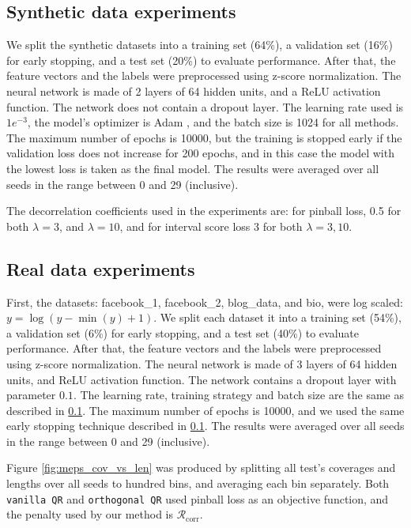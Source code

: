 \documentclass{article}
\begin{document}
\begin{appendices}
\subsection{Synthetic data experiments}\label{syn_exp_description}
We split the synthetic datasets into a training set (64\%), a validation set (16\%) for early stopping, and a test set (20\%) to evaluate performance.
After that, the feature vectors and the labels were preprocessed using z-score normalization.
The neural network is made of 2 layers of 64 hidden units, and a ReLU activation function. The network does not contain a dropout layer. The learning rate used is $1e^{-3}$, the model's optimizer is Adam \cite{adam}, and the batch size is 1024 for all methods.
The maximum number of epochs is 10000, but the training is stopped early if the validation loss does not increase for 200 epochs, and in this case the model with the lowest loss is taken as the final model. 
The results were averaged over all seeds in the range between 0 and 29 (inclusive).

The decorrelation coefficients used in the experiments are: for pinball loss, 0.5 for both $\lambda=3$, and $\lambda=10$, and for interval score loss 3 for both $\lambda=3, 10$.

\subsection{Real data experiments}\label{real_exp_description}
First, the datasets: facebook\_1, facebook\_2, blog\_data, and bio, were log scaled: $y = \log(y-\min(y)+1)$.
We split each dataset it into a training set (54\%), a validation set (6\%) for early stopping, and a test set (40\%) to evaluate performance.
After that, the feature vectors and the labels were preprocessed using z-score normalization.
The neural network is made of 3 layers of 64 hidden units, and ReLU activation function. The network contains a dropout layer with parameter $0.1$. The learning rate, training strategy and batch size are the same as described in \ref{syn_exp_description}.
The maximum number of epochs is 10000, and we used the same early stopping technique described in \ref{syn_exp_description}.
The results were averaged over all seeds in the range between 0 and 29 (inclusive).

Figure \ref{fig:meps_cov_vs_len} was produced by splitting all test's coverages and lengths over all seeds to hundred bins, and averaging each bin separately. Both \texttt{vanilla QR} and \texttt{orthogonal QR} used pinball loss as an objective function, and the penalty used by our method is $\mathcal{R}_{\textrm{corr}}$.


\end{appendices}
\end{document}
